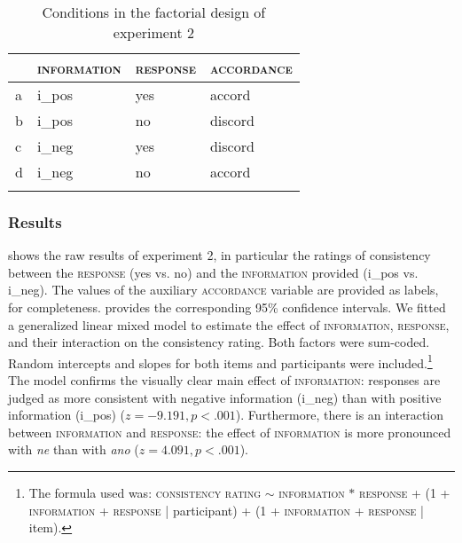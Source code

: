 \documentclass[output=paper,colorlinks,citecolor=brown]{langscibook}
\begin{document}
\begin{table}[h]
    \begin{tabularx}{.65\textwidth}{llXl}
    \lsptoprule
         &\textsc{information}&\textsc{response}&\textsc{accordance}\smallskip\\
         \midrule
a&\textsf{i\_pos}&\textsf{yes}&\textsf{accord}\\
b&\textsf{i\_pos}&\textsf{no}&\textsf{discord}\\
c&\textsf{i\_neg}&\textsf{yes}&\textsf{discord}\\
d&\textsf{i\_neg}&\textsf{no}&\textsf{accord}\\
    \lspbottomrule
    \end{tabularx}
    \caption{Conditions in the factorial design of experiment 2}
    \label{hrdsim:tab:exp2}
\end{table}

\subsubsection{Results}

 shows the raw results of experiment 2, in particular the ratings of consistency between the \textsc{response} (\textsf{yes} vs. \textsf{no}) and the \textsc{information} provided (\textsf{i\_pos} vs. \textsf{i\_neg}). The values of the auxiliary \textsc{accordance} variable are provided as labels, for completeness.  provides the corresponding 95\% confidence intervals. We fitted a generalized linear mixed model to estimate the effect of \textsc{information}, \textsc{response}, and their interaction on the consistency rating. Both factors were sum-coded. Random intercepts and slopes for both items and participants were included.\footnote{The formula used was: \textsc{consistency rating} $\sim$ \textsc{information} $*$ \textsc{response} + (1 + \textsc{information} + \textsc{response} | participant) + (1 + \textsc{information} + \textsc{response} | item).} The model confirms the visually clear main effect of \textsc{information}: responses are judged as more consistent with negative information (\textsf{i\_neg}) than with positive information (\textsf{i\_pos}) ($z=-9.191,p<.001$). Furthermore, there is an interaction between \textsc{information} and \textsc{response}: the effect of \textsc{information} is more pronounced with \textit{ne} than with \textit{ano} ($z=4.091,p<.001$).
\end{document}
